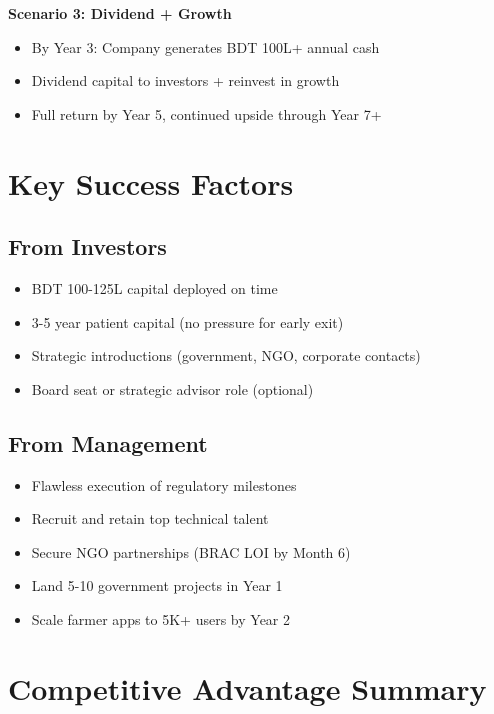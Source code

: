 \textbf{Scenario 3: Dividend + Growth}
\begin{itemize}
    \item By Year 3: Company generates BDT 100L+ annual cash
    \item Dividend capital to investors + reinvest in growth
    \item Full return by Year 5, continued upside through Year 7+
\end{itemize}

\section{Key Success Factors}

\subsection{From Investors}

\begin{itemize}
    \item BDT 100-125L capital deployed on time
    \item 3-5 year patient capital (no pressure for early exit)
    \item Strategic introductions (government, NGO, corporate contacts)
    \item Board seat or strategic advisor role (optional)
\end{itemize}

\subsection{From Management}

\begin{itemize}
    \item Flawless execution of regulatory milestones
    \item Recruit and retain top technical talent
    \item Secure NGO partnerships (BRAC LOI by Month 6)
    \item Land 5-10 government projects in Year 1
    \item Scale farmer apps to 5K+ users by Year 2
\end{itemize}

\section{Competitive Advantage Summary}

